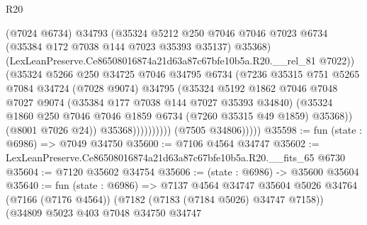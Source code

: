 \begin{lexlean}{R20}
\begin{coremodule}
{                                (@7024 @6734)
                                @34793
                                (@35324
                                  @5212
                                  @250
                                  @7046
                                  @7046
                                  @7023
                                  @6734
                                  (@35384 @172 @7038 @144 @7023 @35393 @35137)
                                  @35368)
                                (LexLeanPreserve.Ce86508016874a21d63a87c67bfe10b5a.R20.__rel_81
                                  @7022))
                              (@35324
                                @5266
                                @250
                                @34725
                                @7046
                                @34795
                                @6734
                                (@7236
                                  @35315
                                  @751
                                  @5265
                                  @7084
                                  @34724
                                  (@7028 @9074)
                                  @34795
                                  (@35324
                                    @5192
                                    @1862
                                    @7046
                                    @7048
                                    @7027
                                    @9074
                                    (@35384 @177 @7038 @144 @7027 @35393 @34840)
                                    (@35324
                                      @1860
                                      @250
                                      @7046
                                      @7046
                                      @1859
                                      @6734
                                      (@7260 @35315 @49 @1859)
                                      @35368))
                                  (@8001 @7026 @24))
                                @35368))))))))))
            (@7505 @34806)))))
@35598 := fun (state : @6986) => @7049 @34750
@35600 := @7106 @4564 @34747
@35602 := LexLeanPreserve.Ce86508016874a21d63a87c67bfe10b5a.R20.__fits_65 @6730
@35604 := @7120 @35602 @34754
@35606 := (state : @6986) -> @35600 @35604
@35640 := fun (state : @6986) =>
  @7137
    @4564
    @34747
    @35604
    @5026
    @34764
    (@7166 (@7176 @4564))
    (@7182 (@7183 (@7184 @5026) @34747 @7158))
    (@34809
      @5023
      @403
      @7048
      @34750
      @34747
}
\end{coremodule}
\end{lexlean}
